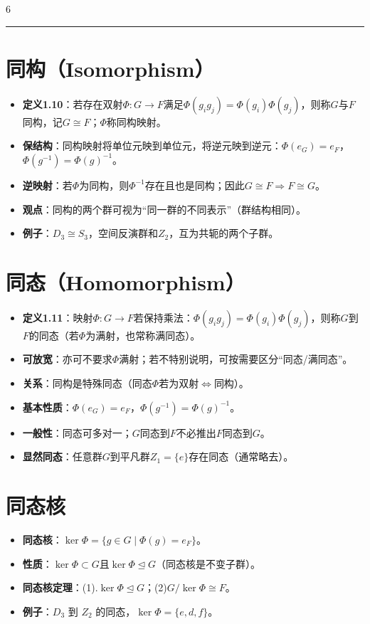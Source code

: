\documentclass[landscape]{article}
\begin{document}
\begin{multicols*}{6}
\noindent\textcolor{red}{\rule{\linewidth}{1pt}}
\section*{同构（Isomorphism）}
\begin{itemize}
  \item \textbf{定义1.10}：若存在双射$\Phi:G\to F$满足$\Phi(g_ig_j)=\Phi(g_i)\Phi(g_j)$，则称$G$与$F$同构，记$G\cong F$；$\Phi$称同构映射。
  \item \textbf{保结构}：同构映射将单位元映到单位元，将逆元映到逆元：$\Phi(e_G)=e_F$，$\Phi(g^{-1})=\Phi(g)^{-1}$。
  \item \textbf{逆映射}：若$\Phi$为同构，则$\Phi^{-1}$存在且也是同构；因此$G\cong F\Rightarrow F\cong G$。
  \item \textbf{观点}：同构的两个群可视为“同一群的不同表示”（群结构相同）。
  \item \textbf{例子}：$D_3\cong S_3$，空间反演群和$Z_2$，互为共轭的两个子群。
\end{itemize}

\section*{同态（Homomorphism）}
\begin{itemize}
  \item \textbf{定义1.11}：映射$\Phi:G\to F$若保持乘法：$\Phi(g_ig_j)=\Phi(g_i)\Phi(g_j)$，则称$G$到$F$的同态（若$\Phi$为满射，也常称满同态）。
  \item \textbf{可放宽}：亦可不要求$\Phi$满射；若不特别说明，可按需要区分“同态/满同态”。
  \item \textbf{关系}：同构是特殊同态（同态$\Phi$若为双射$\Leftrightarrow$同构）。
  \item \textbf{基本性质}：$\Phi(e_G)=e_F$，$\Phi(g^{-1})=\Phi(g)^{-1}$。
  \item \textbf{一般性}：同态可多对一；$G$同态到$F$不必推出$F$同态到$G$。
  \item \textbf{显然同态}：任意群$G$到平凡群$Z_1=\{e\}$存在同态（通常略去）。
\end{itemize}

\section*{同态核}
\begin{itemize}
  \item \textbf{同态核}：$\ker\Phi=\{g\in G\mid \Phi(g)=e_F\}$。
  \item \textbf{性质}：$\ker\Phi\subset G$且$\ker\Phi\trianglelefteq G$（同态核是不变子群）。
  \item \textbf{同态核定理}：(1).$\ker\Phi\trianglelefteq G$；(2)$G/\ker\Phi\cong F$。
  \item \textbf{例子}：$D_3$ 到 $Z_2$ 的同态，$\ker\Phi=\{e, d, f\}$。
\end{itemize}


\end{multicols*}
\end{document}
